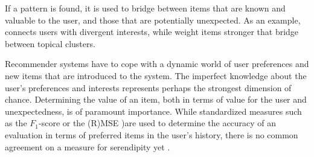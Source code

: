 If a pattern is found, it is used to bridge between items that are known and valuable to the user, and those that are potentially unexpected. As an example,  \cite{Sugiyama2011} connects users with divergent interests, while \cite{Onuma2009} weight items stronger that bridge between topical clusters. 

Recommender systems have to cope with a dynamic world of user preferences and new items that are introduced to the system. The imperfect knowledge about the user's preferences and interests represents perhaps the strongest dimension of chance. Determining the value of an item, both in terms of value for the user and unexpectedness, is of paramount importance. While standardized measures such as the $F_1$-score or the (R)MSE )are used to determine the  accuracy of an evaluation in terms of preferred items in the user's history, there is no common agreement on a measure for serendipity yet \cite{ Murakami2008, Adamopoulos2011, McCay-Peet2011}.